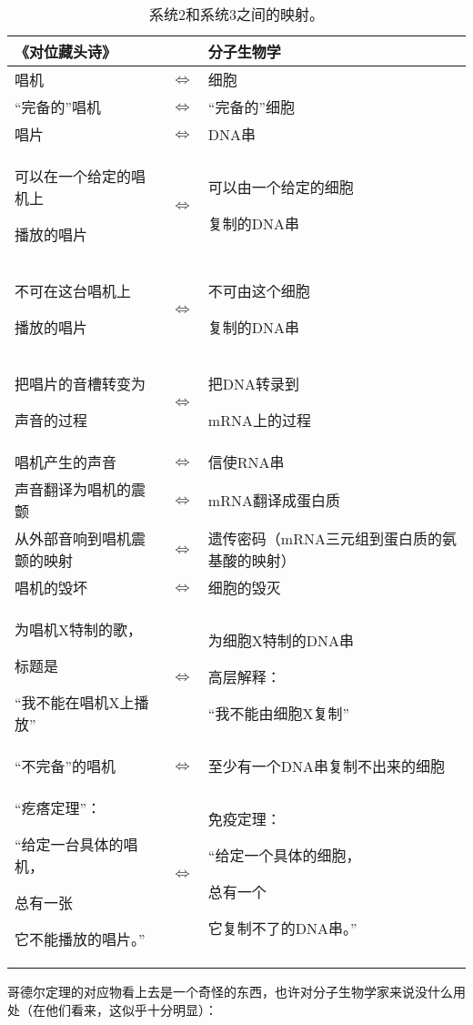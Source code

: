 \begin{table}
\caption{系统2和系统3之间的映射。}\label{tab:2-3-mapping}
\begin{tabu}[c]{@{}X[r]cX[l]@{}}
\toprule
《对位藏头诗》 & & 分子生物学\\
\midrule
唱机 & $\iff$ & 细胞\\
“完备的”唱机 & $\iff$ & “完备的”细胞\\
唱片 & $\iff$ & DNA串\\
可以在一个给定的唱机上\par 播放的唱片 & $\iff$ & 可以由一个给定的细胞\par 复制的DNA串\strut\\
不可在这台唱机上\par 播放的唱片 & $\iff$ & 不可由这个细胞\par 复制的DNA串\strut\\
把唱片的音槽转变为\par 声音的过程 & $\iff$ & 把DNA转录到\par mRNA上的过程\strut\\
唱机产生的声音 & $\iff$ & 信使RNA串\\
声音翻译为唱机的震颤 & $\iff$ & mRNA翻译成蛋白质\\
从外部音响到唱机震颤的映射 & $\iff$ & 遗传密码（mRNA三元组到蛋白质的氨基酸的映射）\strut\\
唱机的毁坏 & $\iff$ & 细胞的毁灭\\
为唱机X特制的歌，\par 标题是\par “我不能在唱机X上播放” & $\iff$ & 为细胞X特制的DNA串\par 高层解释：\par “我不能由细胞X复制”\strut\\
“不完备”的唱机 & $\iff$ & 至少有一个DNA串复制不出来的细胞\strut\\
“疙瘩定理”：\par “给定一台具体的唱机，\par 总有一张\par 它不能播放的唱片。” & $\iff$ & 免疫定理：\par “给定一个具体的细胞，\par 总有一个\par 它复制不了的DNA串。”\strut\\
\bottomrule
\end{tabu}
\end{table}

哥德尔定理的对应物看上去是一个奇怪的东西，也许对分子生物学家来说没什么用处（在他们看来，这似乎十分明显）：

